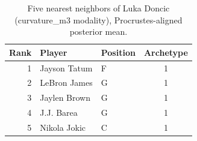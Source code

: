 \begin{table}[htbp]
  \centering\small
  \begin{tabular}{rllc}
    \toprule
    Rank & Player & Position & Archetype \\
    \midrule
    1 & Jayson Tatum & F & 1 \\
    2 & LeBron James & G & 1 \\
    3 & Jaylen Brown & G & 1 \\
    4 & J.J. Barea & G & 1 \\
    5 & Nikola Jokic & C & 1 \\
    \bottomrule
  \end{tabular}
  \caption{Five nearest neighbors of Luka Doncic (curvature_m3 modality), Procrustes-aligned posterior mean.}
  \label{tab:Luka_Doncic_neighbors_curvature_m3}
\end{table}

